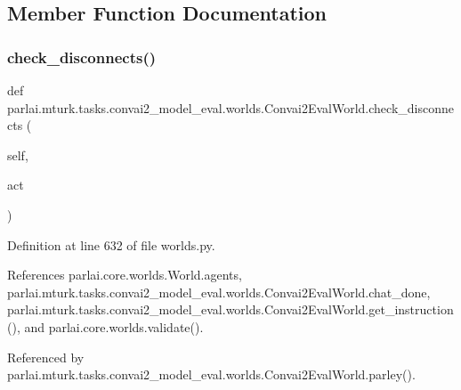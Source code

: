 \subsection{Member Function Documentation}
\mbox{\label{classparlai_1_1mturk_1_1tasks_1_1convai2__model__eval_1_1worlds_1_1Convai2EvalWorld_a53f3038cc93afa14d4b4a9fb72d6ca73}} 
\subsubsection{\texorpdfstring{check\+\_\+disconnects()}{check\_disconnects()}}
{\footnotesize\ttfamily def parlai.\+mturk.\+tasks.\+convai2\+\_\+model\+\_\+eval.\+worlds.\+Convai2\+Eval\+World.\+check\+\_\+disconnects (\begin{DoxyParamCaption}\item[{}]{self,  }\item[{}]{act }\end{DoxyParamCaption})}



Definition at line 632 of file worlds.\+py.



References parlai.\+core.\+worlds.\+World.\+agents, parlai.\+mturk.\+tasks.\+convai2\+\_\+model\+\_\+eval.\+worlds.\+Convai2\+Eval\+World.\+chat\+\_\+done, parlai.\+mturk.\+tasks.\+convai2\+\_\+model\+\_\+eval.\+worlds.\+Convai2\+Eval\+World.\+get\+\_\+instruction(), and parlai.\+core.\+worlds.\+validate().



Referenced by parlai.\+mturk.\+tasks.\+convai2\+\_\+model\+\_\+eval.\+worlds.\+Convai2\+Eval\+World.\+parley().

